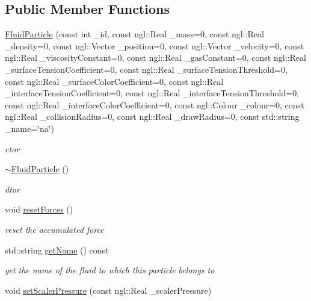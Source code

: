 \subsection*{Public Member Functions}
\begin{DoxyCompactItemize}
\item 
\hyperlink{class_fluid_particle_a78948d812fd65d8e536ad7f10a20e695}{FluidParticle} (const int \_\-id, const ngl::Real \_\-mass=0, const ngl::Real \_\-density=0, const ngl::Vector \_\-position=0, const ngl::Vector \_\-velocity=0, const ngl::Real \_\-viscosityConstant=0, const ngl::Real \_\-gasConstant=0, const ngl::Real \_\-surfaceTensionCoefficient=0, const ngl::Real \_\-surfaceTensionThreshold=0, const ngl::Real \_\-surfaceColorCoefficient=0, const ngl::Real \_\-interfaceTensionCoefficient=0, const ngl::Real \_\-interfaceTensionThreshold=0, const ngl::Real \_\-interfaceColorCoefficient=0, const ngl::Colour \_\-colour=0, const ngl::Real \_\-collisionRadius=0, const ngl::Real \_\-drawRadius=0, const std::string \_\-name=\char`\"{}na\char`\"{})
\begin{DoxyCompactList}\small\item\em ctor \item\end{DoxyCompactList}\item 
\hyperlink{class_fluid_particle_a5b00e708cb5123c8883b67168488da09}{$\sim$FluidParticle} ()
\begin{DoxyCompactList}\small\item\em dtor \item\end{DoxyCompactList}\item 
void \hyperlink{class_fluid_particle_acc7205ff8364fd974adbb5bc6d890520}{resetForces} ()
\begin{DoxyCompactList}\small\item\em reset the accumulated force \item\end{DoxyCompactList}\item 
std::string \hyperlink{class_fluid_particle_a0c75715af37734d00ab61b57fbc0e591}{getName} () const 
\begin{DoxyCompactList}\small\item\em get the name of the fluid to which this particle belongs to \item\end{DoxyCompactList}\item 
void \hyperlink{class_fluid_particle_abfd00e4a0fb0adcad1b320c3ddcdf257}{setScalerPressure} (const ngl::Real \_\-scalerPressure)

\end{DoxyCompactItemize}
